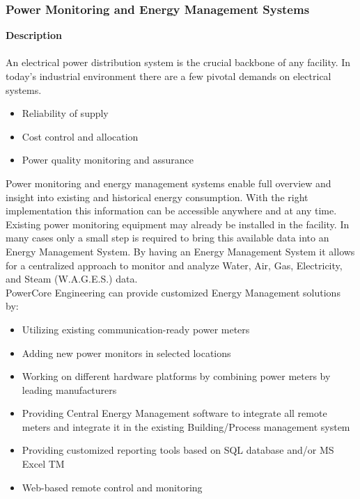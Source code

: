 \subsubsection{Power Monitoring and Energy Management Systems}
\label{Sub:Exp:PM}

\textbf{Description}\\
\\	
An electrical power distribution system is the crucial backbone of any facility. In today's industrial environment there are a few pivotal demands on electrical systems. 
\begin{itemize}
	\item Reliability of supply
	\item Cost control and allocation
	\item Power quality monitoring and assurance
\end{itemize}

Power monitoring and energy management systems enable full overview and insight into existing and historical energy consumption. With the right implementation this information can be accessible anywhere and at any time.\\ 

Existing power monitoring equipment may already be installed in the facility. In many cases only a small step is required to bring this available data into an Energy Management System. By having an Energy Management System it allows for a centralized approach to monitor and analyze Water, Air, Gas, Electricity, and Steam (W.A.G.E.S.) data. \\

PowerCore Engineering can provide customized Energy Management solutions by: 
\begin{itemize}
	\item Utilizing existing communication-ready power meters
	\item Adding new power monitors in selected locations
	\item Working on different hardware platforms by combining power meters by leading manufacturers
	\item Providing Central Energy Management software to integrate all remote meters and integrate it in the existing Building/Process management system
	\item Providing customized reporting tools based on SQL database and/or MS Excel TM
	\item Web-based remote control and monitoring

\end{itemize}


